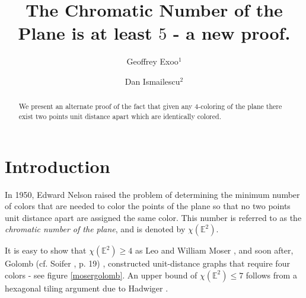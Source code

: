 \documentclass [11pt,oneside]{amsart}
\title{The Chromatic Number of the Plane is at least $5$ - a new proof. }
\author{Geoffrey Exoo$^1$}
\author{Dan Ismailescu$^2$}
\theoremstyle{definition}
\theoremstyle{plain}
\newcommand{\exoonote}[1] {
	{\color{red}{{\tt [Comment: }{#1}]}}
}
\begin{document}

\begin{abstract}
We present an alternate proof of the fact that given any $4$-coloring of the plane there exist two points unit distance apart which are identically colored.
\end{abstract}
\maketitle

\section{\bf Introduction}

In 1950, Edward Nelson raised the problem of determining the minimum number of colors that are needed to color the points of the plane so that no two points unit distance apart are assigned the same color. This number is referred to as the {\it chromatic number of the plane}, and is denoted by $\chi(\mathbb{E}^2)$.

It is easy to show that $\chi(\mathbb{E}^2)\ge 4$ as Leo and William Moser \cite{MM}, and soon after, Golomb (cf. Soifer \cite{soifer}, p. 19) , constructed unit-distance graphs that require four colors - see figure \ref{mosergolomb}. An upper bound of $\chi(\mathbb{E}^2)\le 7$ follows from a hexagonal tiling argument due to Hadwiger \cite{hadwiger}.
\end{document}
